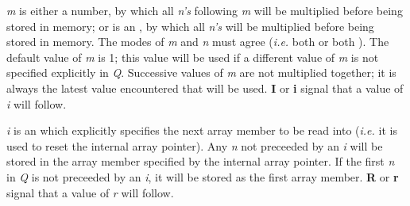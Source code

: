 {\it m} is either a {\flpt} number, by which all {\flpt} {\it n's} following
{\it m} will be multiplied before being stored in memory; or is an \intg,
by which all {\intg} {\it n's} will be multiplied before being stored in memory.
The modes of {\it m} and {\it n} must agree ({\it i.e.} both
{\intg} or both \flpt). The default value of {\it m} is 1; this value will be
used if a different value of {\it m} is not specified explicitly in {\it Q}.
Successive values of {\it m} are not multiplied together; it is always
the latest value encountered that will be used.
\blankline
{\bf I} or {\bf i} signal that a value of {\it i} will follow.

{\it i} is an {\intg} which explicitly specifies the next array member to be read
into ({\it i.e.} it is used to reset the internal array pointer). Any {\it n}
not preceeded by an {\it i} will be stored in the array member specified
by the internal array pointer. If the first {\it n} in {\it Q} is not
preceeded by an {\it i}, it will be stored as the first array member.
\blankline
{\bf R} or {\bf r} signal that a value of {\it r} will follow.

